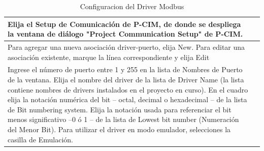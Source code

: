 \begin{itemize}
\begin{table}[H]
\begin{tabular}{*{2}{m{}}}
  Elija el Setup de Comunicación de P-CIM, de donde se despliega la ventana 
  de diálogo "Project Communication Setup" de P-CIM.
  &\begin{center}
    \rule{0.4\textwidth}{0.3\textwidth}
  \end{center}\\
\hline
  Para agregar una nueva asociación driver-puerto, elija New.
  Para editar una asociación existente, marque la línea correspondiente
  y elija Edit
  &\begin{center}
    \rule{0.4\textwidth}{0.3\textwidth}
  \end{center}\\
\hline
  Ingrese el número de puerto entre 1 y 255 en la lista de Nombres de 
  Puerto de la ventana.
  Elija el nombre del driver de la lista de Driver Name (la lista 
  contiene nombres de drivers instalados en el proyecto en curso).
  En el cuadro elija la notación numérica del bit – octal, decimal o 
  hexadecimal – de la lista de Bit numbering system.
  Elija la notación usada para referenciar el bit menos significativo –0 
   ó 1 – de la lista de Lowest bit number (Numeración del Menor Bit).
  Para utilizar el driver en modo emulador, selecciones la casilla de 
  Emulación.
  &\begin{center}
    \rule{0.4\textwidth}{0.3\textwidth}
  \end{center}\\
\hline
\end{tabular}
\label{tab:ConfigModbus}
\caption{Configuracion del Driver Modbus}
\end{table}
 
 
 

\end{itemize}

